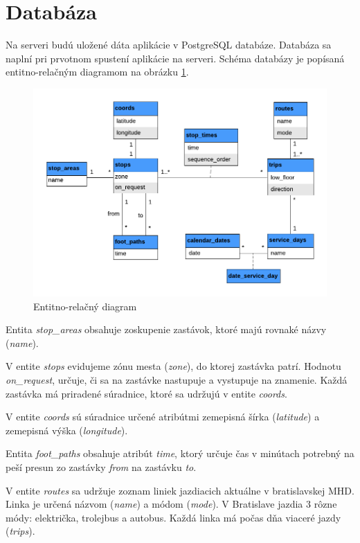 \section{Databáza}

Na serveri budú uložené dáta aplikácie v PostgreSQL databáze. Databáza sa naplní pri prvotnom spustení aplikácie na serveri. Schéma databázy je popísaná entitno-relačným diagramom na obrázku \ref{fig:erd}.

\begin{figure}[H]
\centerline{\includegraphics[width=1.0\textwidth]{images/ERD}}
\caption[Entitno-relačný diagram]{Entitno-relačný diagram}
\label{fig:erd}
\end{figure}

Entita \textit{stop\_areas} obsahuje zoskupenie zastávok, ktoré majú rovnaké názvy (\textit{name}). 


V entite \textit{stops} evidujeme zónu mesta (\textit{zone}), do ktorej zastávka patrí. Hodnotu \textit{on\_request}, určuje, či sa na  zastávke nastupuje a vystupuje na znamenie. Každá zastávka má priradené súradnice, ktoré sa udržujú v entite \textit{coords}.

V entite \textit{coords} sú súradnice určené atribútmi zemepisná šírka (\textit{latitude}) a zemepisná výška (\textit{longitude}). 

Entita \textit{foot\_paths} obsahuje atribút \textit{time}, ktorý určuje čas v minútach potrebný na peší presun zo zastávky \textit{from} na zastávku \textit{to}.

V entite \textit{routes} sa udržuje zoznam liniek jazdiacich aktuálne v bratislavskej MHD. Linka je určená názvom (\textit{name}) a módom (\textit{mode}). V Bratislave jazdia 3 rôzne módy: električka, trolejbus a autobus. Každá linka má počas dňa viaceré jazdy (\textit{trips}).

